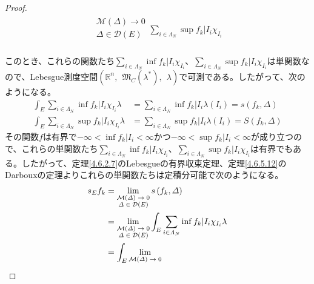 \documentclass[dvipdfmx]{jsarticle}
\begin{document}
\begin{proof}
\begin{align*}
{\begin{matrix}
\mathcal{M}(\varDelta) \rightarrow 0 \\
\varDelta \in \mathcal{D}(E) \\
\end{matrix}}{\sum_{i \in \varLambda_{N}} {\sup{f_{k}|I_{i}}\chi_{I_{i}}}}
\end{align*}\par
このとき、これらの関数たち$\sum_{i \in \varLambda_{N}} {\inf{f_{k}|I_{i}}\chi_{I_{i}}}$、$\sum_{i \in \varLambda_{N}} {\sup{f_{k}|I_{i}}\chi_{I_{i}}}$は単関数なので、Lebesgue測度空間$\left( \mathbb{R}^{n},\ \ \mathfrak{M}_{C}\left( \lambda^{*} \right),\ \ \lambda \right)$で可測である。したがって、次のようになる。
\begin{align*}
\int_{E} {\sum_{i \in \varLambda_{N}} {\inf{f_{k}|I_{i}}\chi_{I_{i}}}\lambda} &= \sum_{i \in \varLambda_{N}} {\inf{f_{k}|I_{i}}\lambda\left( I_{i} \right)} = s\left( f_{k},\varDelta \right)\\
\int_{E} {\sum_{i \in \varLambda_{N}} {\sup{f_{k}|I_{i}}\chi_{I_{i}}}\lambda} &= \sum_{i \in \varLambda_{N}} {\sup{f_{k}|I_{i}}\lambda\left( I_{i} \right)} = S\left( f_{k},\varDelta \right)
\end{align*}
その関数$f$は有界で$- \infty < \inf{f_{k}|I_{i}} < \infty$かつ$- \infty < \sup{f_{k}|I_{i}} < \infty$が成り立つので、これらの単関数たち$\sum_{i \in \varLambda_{N}} {\inf{f_{k}|I_{i}}\chi_{I_{i}}}$、$\sum_{i \in \varLambda_{N}} {\sup{f_{k}|I_{i}}\chi_{I_{i}}}$は有界でもある。したがって、定理\ref{4.6.2.7}のLebesgueの有界収束定理、定理\ref{4.6.5.12}のDarbouxの定理よりこれらの単関数たちは定積分可能で次のようになる。
\begin{align*}
s_{E}f_{k} &= \lim_{\scriptsize \begin{matrix}
\mathcal{M}(\varDelta) \rightarrow 0 \\
\varDelta \in \mathcal{D}(E) \\
\end{matrix}}{s\left( f_{k},\varDelta \right)}\\
&= \lim_{\scriptsize \begin{matrix}
\mathcal{M}(\varDelta) \rightarrow 0 \\
\varDelta \in \mathcal{D}(E) \\
\end{matrix}}{\int_{E} {\sum_{i \in \varLambda_{N}} {\inf{f_{k}|I_{i}}\chi_{I_{i}}}\lambda}}\\
&= \int_{E} {\lim_{\scriptsize \begin{matrix}
\mathcal{M}(\varDelta) \rightarrow 0 \\

\end{matrix}}}
\end{align*}
\end{proof}
\end{document}
